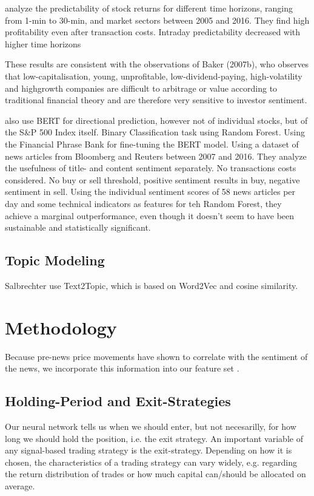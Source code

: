 \documentclass[12pt,a4paper]{article}
\begin{document}
	
	\bigskip
	\textbf{\cite{liu_intraday_2023}} analyze the predictability of stock returns for different time horizons, ranging from 1-min to 30-min, and market sectors between 2005 and 2016.
	They find high profitability even after transaction costs.
	Intraday predictability decreased with higher time horizons
	
	
	\bigskip
	These results are consistent with the observations of Baker (2007b), who observes that low-capitalisation, young, unprofitable, low-dividend-paying, high-volatility and highgrowth companies are difficult to arbitrage or value according to traditional financial theory and are therefore very sensitive to investor sentiment.
	
	\bigskip
	\textbf{\cite{fazlija_using_2022}} also use BERT for directional prediction, however not of individual stocks, but of the S\&P 500 Index itself.
	Binary Classification task using Random Forest.
	Using the Financial Phrase Bank for fine-tuning the BERT model. %
	Using a dataset of news articles from Bloomberg and Reuters between 2007 and 2016. %
	They analyze the usefulness of title- and content sentiment separately.
	No transactions costs considered.
	No buy or sell threshold, positive sentiment results in buy, negative sentiment in sell.
	Using the individual sentiment scores of 58 news articles per day and some technical indicators as features for teh
	Random Forest, they achieve a marginal outperformance, even though it doesn't seem to have been sustainable and statistically significant.
	
	\subsection{Topic Modeling}
	Salbrechter use Text2Topic, which is based on Word2Vec and cosine similarity.
	
	
	
	
	\section{Methodology}
	Because pre-news price movements have shown to correlate with the sentiment of the news, we incorporate this information
	into our feature set \cite{ke_predicting_2020}.
	
	\subsection{Holding-Period and Exit-Strategies}
	Our neural network tells us when we should enter, but not necesarilly, for how long we should hold the position, i.e. the exit strategy.
	An important variable of any signal-based trading strategy is the exit-strategy.
	Depending on how it is chosen, the characteristics of a trading strategy can vary widely, e.g. regarding the return distribution of trades or how much capital can/should be allocated on average.
	
\end{document}
